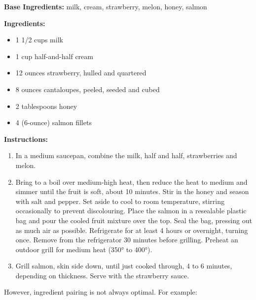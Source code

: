 \begin{tcolorbox}[recipebox={Grilled Salmon With Strawberry Sauce}]
	\textbf{Base Ingredients:} milk, cream, strawberry, melon, honey, salmon

	\vspace{0.5em}
	\textbf{Ingredients:}
	\begin{itemize}
		\item 1 1/2 cups milk
		\item 1 cup half-and-half cream
		\item 12 ounces strawberry, hulled and quartered
		\item 8 ounces cantaloupes, peeled, seeded and cubed
		\item 2 tablespoons honey
		\item 4 (6-ounce) salmon fillets
	\end{itemize}

	\vspace{0.5em}
	\textbf{Instructions:}
	\begin{enumerate}
		\item In a medium saucepan, combine the milk, half and half, strawberries and melon.
		\item Bring to a boil over medium-high heat, then reduce the heat to medium and simmer until the fruit is soft, about 10 minutes. Stir in the honey and season with salt and pepper. Set aside to cool to room temperature, stirring occasionally to prevent discolouring. Place the salmon in a resealable plastic bag and pour the cooled fruit mixture over the top. Seal the bag, pressing out as much air as possible. Refrigerate for at least 4 hours or overnight, turning once. Remove from the refrigerator 30 minutes before grilling. Preheat an outdoor grill for medium heat (350° to 400°).
		\item Grill salmon, skin side down, until just cooked through, 4 to 6 minutes, depending on thickness. Serve with the strawberry sauce.
	\end{enumerate}
\end{tcolorbox}

However, ingredient pairing is not always optimal. For example:

